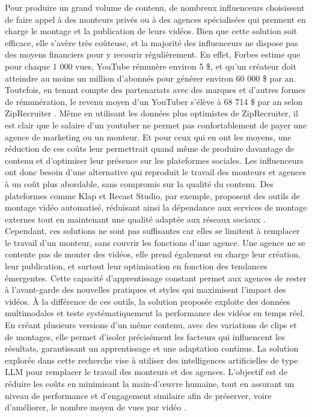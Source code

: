 \documentclass[livre]{udes-genie-these}
\begin{document}
Pour produire un grand volume de contenu, de nombreux influenceurs choisissent de faire appel à des monteurs privés ou à des agences spécialisées qui prennent en charge le montage et la publication de leurs vidéos. Bien que cette solution soit efficace, elle s'avère très coûteuse, et la majorité des influenceurs ne dispose pas des moyens financiers pour y recourir régulièrement. En effet, Forbes estime que pour chaque 1 000 vues, YouTube rémunère environ 5 \$, et qu'un créateur doit atteindre au moins un million d'abonnés pour générer environ 60 000 \$ par an. Toutefois, en tenant compte des partenariats avec des marques et d'autres formes de rémunération, le revenu moyen d'un YouTuber s'élève à 68 714 \$ par an selon ZipRecruiter \cite{financebuzz2024}. Même en utilisant les données plus optimistes de ZipRecruiter, il est clair que le salaire d'un youtuber ne permet pas confortablement de payer une agence de marketing ou un monteur. Et pour ceux qui en ont les moyens, une réduction de ces coûts leur permettrait quand même de produire davantage de contenu et d'optimiser leur présence sur les plateformes sociales.
Les influenceurs ont donc besoin d'une alternative qui reproduit le travail des monteurs et agences à un coût plus abordable, sans compromis sur la qualité du contenu. Des plateformes comme Klap et Recast Studio, par exemple, proposent des outils de montage vidéo automatisé, réduisant ainsi la dépendance aux services de montage externes tout en maintenant une qualité adaptée aux réseaux sociaux \cite{klap2024}\cite{recast2024}.
Cependant, ces solutions ne sont pas suffisantes car elles se limitent à remplacer le travail d’un monteur, sans couvrir les fonctions d’une agence. Une agence ne se contente pas de monter des vidéos, elle prend également en charge leur création, leur publication, et surtout leur optimisation en fonction des tendances émergentes. Cette capacité d’apprentissage constant permet aux agences de rester à l’avant-garde des nouvelles pratiques et styles qui maximisent l’impact des vidéos.
À la différence de ces outils, la solution proposée exploite des données multimodales et teste systématiquement la performance des vidéos en temps réel. En créant plusieurs versions d’un même contenu, avec des variations de clips et de montages, elle permet d’isoler précisément les facteurs qui influencent les résultats, garantissant un apprentissage et une adaptation continus.
La solution explorée dans cette recherche vise à utiliser des intelligences artificielles de type LLM pour remplacer le travail des monteurs et des agences. L'objectif est de réduire les coûts en minimisant la main-d'œuvre humaine, tout en assurant un niveau de performance et d'engagement similaire afin de préserver, voire d'améliorer, le nombre moyen de vues par vidéo \cite{ssemble2024}\cite{opusclip2024}.
\end{document}
